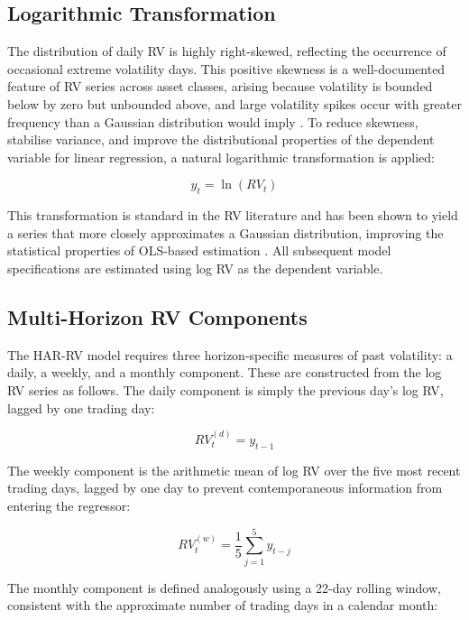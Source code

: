 \documentclass[12pt,a4paper]{report}
\begin{document}
\subsection{Logarithmic Transformation}
The distribution of daily RV is highly right-skewed, reflecting the occurrence of occasional extreme volatility days. This positive skewness is a well-documented feature of RV series across asset classes, arising because volatility is bounded below by zero but unbounded above, and large volatility spikes occur with greater frequency than a Gaussian distribution would imply \citep{Andersen2003a}. To reduce skewness, stabilise variance, and improve the distributional properties of the dependent variable for linear regression, a natural logarithmic transformation is applied:

\begin{equation}
y_t = \ln(RV_t)
\end{equation}

\noindent This transformation is standard in the RV literature and has been shown to yield a series that more closely approximates a Gaussian distribution, improving the statistical properties of OLS-based estimation \citep{Andersen2003a}. All subsequent model specifications are estimated using log RV as the dependent variable.

\subsection{Multi-Horizon RV Components}
The HAR-RV model requires three horizon-specific measures of past volatility: a daily, a weekly, and a monthly component. These are constructed from the log RV series as follows. The daily component is simply the previous day's log RV, lagged by one trading day:

\begin{equation}
RV_t^{(d)} = y_{t-1}
\end{equation}

\noindent The weekly component is the arithmetic mean of log RV over the five most recent trading days, lagged by one day to prevent contemporaneous information from entering the regressor:

\begin{equation}
RV_t^{(w)} = \frac{1}{5} \sum_{j=1}^{5} y_{t-j}
\end{equation}

\noindent The monthly component is defined analogously using a 22-day rolling window, consistent with the approximate number of trading days in a calendar month:
\end{document}
